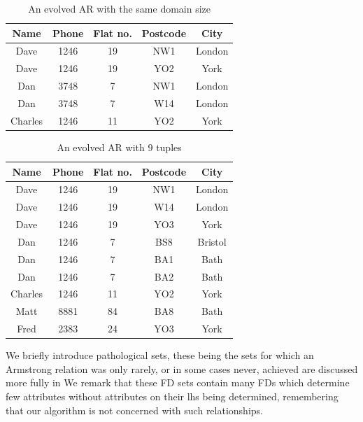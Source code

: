 {\line
\begin{table}
\begin{center}
\begin{tabular}{|c|c|c|c|c|} \hline 
{ \bf Name} & { \bf Phone} & {\bf Flat no. }  & { \bf Postcode}  & {\bf City} \\ \hline
Dave & 1246 & 19 & NW1 & London  \\
Dave & 1246 & 19 & YO2 & York \\
Dan & 3748 & 7 & NW1 & London \\
Dan & 3748 & 7 & W14 & London \\
Charles & 1246 & 11 & YO2 & York \\ \hline
\end{tabular}
\end{center}
\caption{\label{table:5.32} An evolved AR with the same domain size }
\end{table}
}

{\line
\begin{table}
\begin{center}
\begin{tabular}{|c|c|c|c|c|} \hline 
{ \bf Name} & { \bf Phone} & {\bf Flat no. }  & { \bf Postcode}  & {\bf City} \\ \hline
Dave & 1246 & 19 & NW1 & London  \\
Dave & 1246 & 19 & W14 & London \\
Dave & 1246 & 19 & YO3 & York \\
Dan & 1246 & 7 & BS8 & Bristol \\
Dan & 1246 & 7 & BA1 & Bath \\
Dan & 1246 & 7 & BA2 & Bath \\
Charles & 1246 & 11 & YO2 & York \\
Matt & 8881 & 84 & BA8 & Bath \\
Fred & 2383 & 24 & YO3 & York \\ \hline
\end{tabular}
\end{center}
\caption{\label{table:5.34} An evolved AR with 9 tuples }
\end{table}
}

\medskip
{}
We briefly introduce pathological sets, these being
the sets for which an Armstrong relation was only rarely,
or in some cases never, achieved are discussed more fully in \cite{cl96}
We remark that these FD sets contain many FDs which determine
few attributes without attributes on their lhs being determined,
remembering that 
our algorithm is not concerned with such relationships.

